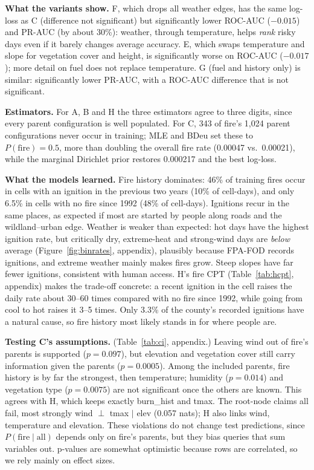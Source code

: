 \documentclass[11pt]{article}
\begin{document}
\textbf{What the variants show.} F, which drops all weather edges, has the same log-loss as C
(difference not significant) but significantly lower ROC-AUC ($-0.015$) and PR-AUC (by about 30\%): weather,
through temperature, helps \emph{rank} risky days even if it barely changes average accuracy. E, which
swaps temperature and slope for vegetation cover and height, is significantly worse on ROC-AUC
($-0.017$); more detail on fuel does not replace temperature. G (fuel and history only) is similar: significantly lower PR-AUC, with a ROC-AUC difference that is not significant.

\textbf{Estimators.} For A, B and H the three estimators agree to three digits, since every parent
configuration is well populated. For C, 343 of fire's 1,024 parent configurations never occur in
training; MLE and BDeu set these to $P(\text{fire})=0.5$, more than doubling the overall fire rate
(0.00047 vs.\ 0.00021), while the marginal Dirichlet prior restores 0.000217 and the best log-loss.

\textbf{What the models learned.} Fire history dominates: 46\% of training fires occur in cells with
an ignition in the previous two years (10\% of cell-days), and only 6.5\% in cells with no fire since
1992 (48\% of cell-days). Ignitions recur in the same places, as expected if most are started by
people along roads and the wildland--urban edge. Weather is weaker than expected: hot days have the
highest ignition rate, but critically dry, extreme-heat and strong-wind days are \emph{below} average
(Figure~\ref{fig:binrates}, appendix), plausibly because FPA-FOD records ignitions, and extreme
weather mainly makes fires grow. Steep slopes have far fewer ignitions, consistent with human access.
H's fire CPT (Table~\ref{tab:hcpt}, appendix) makes the trade-off concrete: a recent ignition in
the cell raises the daily rate about 30--60 times compared with no fire since 1992, while going
from cool to hot raises it 3--5 times. Only 3.3\% of the county's recorded ignitions have a
natural cause, so fire history most likely stands in for where people are.

\textbf{Testing C's assumptions.} (Table~\ref{tab:ci}, appendix.) Leaving wind out of fire's parents
is supported ($p=0.097$), but elevation and vegetation cover still carry information given the
parents ($p=0.0005$). Among the included parents, fire history is by far the strongest, then
temperature; humidity ($p=0.014$) and vegetation type ($p=0.0075$) are not significant once the
others are known. This agrees with H, which keeps exactly burn\_hist and tmax. The root-node claims
all fail, most strongly wind $\perp$ tmax $\mid$ elev (0.057 nats); H also links wind, temperature and
elevation. These violations do not change test predictions, since $P(\text{fire}\mid\text{all})$
depends only on fire's parents, but they bias queries that sum variables out. p-values are somewhat
optimistic because rows are correlated, so we rely mainly on effect sizes.
\end{document}
